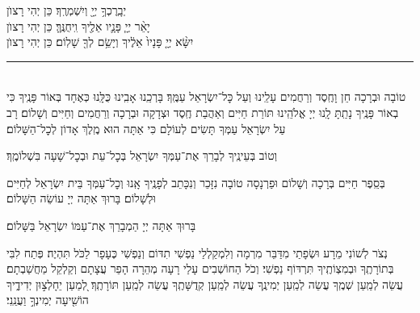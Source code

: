 \documentclass[twoside, openany, parskip=half, 11pt]{book}
\begin{document}
יְבָֽרֶכְךָ֥ יְיָ֖ וְיִשְׁמְרֶֽךָ׃ \hfill \kahal כֵּן יְהִי רָצוׂן \\
יָאֵ֨ר יְיָ֧ פָּנָ֛יו אֵלֶ֖יךָ וִֽיחֻנֶּֽךָּ׃ \hfill \kahal כֵּן יְהִי רָצוׂן \\
יִשָּׂ֨א יְיָ֤ פָּנָיו֙ אֵלֶ֔יךָ וְיָשֵׂ֥ם לְךָ֖ שָׁלֽוֹם׃ \hfill \kahal כֵּן יְהִי רָצוׂן

\rule[-0.5ex]{3in}{1pt}

\begin{paracol}{2}
\\
טוֹבָה וּבְרָכָה חֵן וָחֶֽסֶד וְרַחֲמִים עָלֵֽינוּ וְעַל כׇּל־יִשְׂרָאֵל עַמֶּֽךָ׃ בָּרְכֵֽנוּ אָבִֽינוּ כֻּלָּֽנוּ כְּאֶחָד בְּאוֹר פָּנֶֽיךָ כִּי בְאוֹר פָּנֶֽיךָ נָתַֽתָּ לָֽנוּ יְיָ אֱלֹהֵֽינוּ תּוֹרַת חַיִּים וְאַהֲבַת חֶֽסֶד וּצְדָקָה וּבְרָכָה וְרַחֲמִים וְחַיִּים וְשָׁלוֹם׃
\switchcolumn
{}
רָב עַל יִשְׂרָאֵל עַמְּךָ תָּשִׂים לְעוֹלָם כִּי אַתָּה הוּא מֶֽלֶךְ אָדוֹן לְכׇל־הַשָּׁלוֹם׃
\end{paracol}
וְטוֹב בְּעֵינֶֽיךָ לְבָרֵךְ אֶת־עַמְּךָ יִשְׂרָאֵל בְּכׇל־עֵת וּבְכׇל־שָׁעָה בִּשְׁלוֹמֶֽךָ׃


\begin{paracol}{2}
\begin{small}
בְּסֵֽפֶר חַיִּים בְּרָכָה וְשָׁלוֹם וּפַרְנָסָה טוֹבָה נִזָּכֵר וְנִכָּתֵב לְפָנֶֽיךָ אָֽנוּ וְכׇל־עַמְּךָ בֵּית יִשְׂרָאֵל לְחַיִּים וּלְשָׁלוֹם׃ בָּרוּךְ אַתָּה יְיָ עוֹשֵׂה הַשָּׁלוֹם׃

\end{small}
\switchcolumn
בָּרוּךְ אַתָּה יְיָ הַמְבָרֵךְ אֶת־עַמּוֹ יִשְׂרָאֵל בַּשָּׁלוֹם׃

\end{paracol}

נְצֹר לְשׁוֹנִי מֵרָע וּשְׂפָתַי מִדַּבֵּר מִרְמָה וְלִמְקַלְלַי נַפְשִׁי תִדּוֹם וְנַפְשִׁי כֶּעָפָר לַכֹּל תִּהְיֶה׃ פְּתַח לִבִּי בְּתוֹרָתֶֽךָ וּבְמִצְוֹתֶֽיךָ תִּרְדּוֹף נַפְשִׁי׃ וְכֹל הַחוֹשְׁבִים עָלַי רָעָה מְהֵרָה הָפֵר עֲצָתָם וְקַלְקֵל מַחֲשַׁבְתָם׃ עֲשֵׂה לְמַֽעַן שְׁמֶֽךָ עֲשֵׂה לְמַֽעַן יְמִינֶֽךָ עֲשֵׂה לְמַֽעַן קְדֻשָּׁתֶֽךָ עֲשֵׂה לְמַֽעַן תּוֹרָתֶֽךָ׃ לְ֭מַעַן יֵחָלְצ֣וּן יְדִידֶ֑יךָ
הוֹשִׁ֖יעָה יְמִינְךָ֣ וַעֲנֵֽנִי׃
\end{document}
